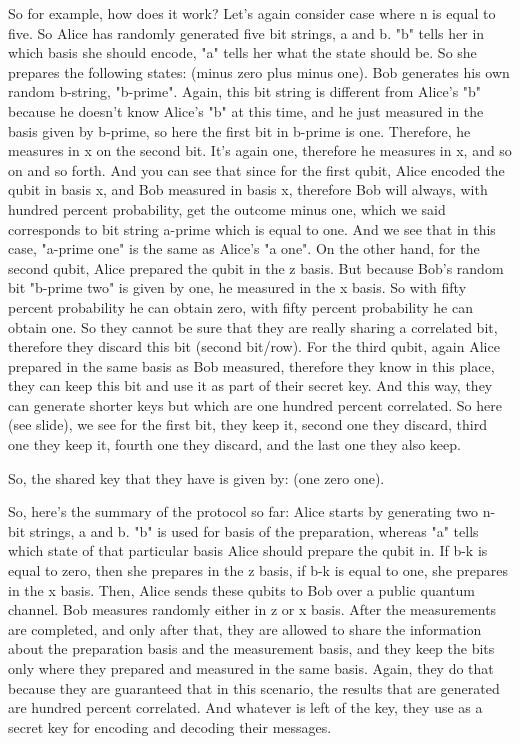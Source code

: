 So for example, how does it work? Let's again consider case where n is equal to five. So Alice has randomly generated five bit strings, a and b. "b" tells her in which basis she should encode, "a" tells her what the state should be. So she prepares the following states: (minus zero plus minus one). Bob generates his own random b-string, "b-prime". Again, this bit string is different from Alice's "b" because he doesn't know Alice's "b" at this time, and he just measured in the basis given by b-prime, so here the first bit in b-prime is one. Therefore, he measures in x on the second bit. It's again one, therefore he measures in x, and so on and so forth. And you can see that since for the first qubit, Alice encoded the qubit in basis x, and Bob measured in basis x, therefore Bob will always, with hundred percent probability, get the outcome minus one, which we said corresponds to bit string a-prime which is equal to one. And we see that in this case, "a-prime one" is the same as Alice's "a one". On the other hand, for the second qubit, Alice prepared the qubit in the z basis. But because Bob's random bit "b-prime two" is given by one, he measured in the x basis. So with fifty percent probability he can obtain zero, with fifty percent probability he can obtain one. So they cannot be sure that they are really sharing a correlated bit, therefore they discard this bit (second bit/row). For the third qubit, again Alice prepared in the same basis as Bob measured, therefore they know in this place, they can keep this bit and use it as part of their secret key. And this way, they can generate shorter keys but which are one hundred percent correlated. So here (see slide), we see for the first bit, they keep it, second one they discard, third one they keep it, fourth one they discard, and the last one they also keep.

So, the shared key that they have is given by: (one zero one).

So, here's the summary of the protocol so far: Alice starts by generating two n-bit strings, a and b. "b" is used for basis of the preparation, whereas "a" tells which state of that particular basis Alice should prepare the qubit in. If b-k is equal to zero, then she prepares in the z basis, if b-k is equal to one, she prepares in the x basis. Then, Alice sends these qubits to Bob over a public quantum channel. Bob measures randomly either in z or x basis. After the measurements are completed, and only after that, they are allowed to share the information about the preparation basis and the measurement basis, and they keep the bits only where they prepared and measured in the same basis. Again, they do that because they are guaranteed that in this scenario, the results that are generated are hundred percent correlated. And whatever is left of the key, they use as a secret key for encoding and decoding their messages.

